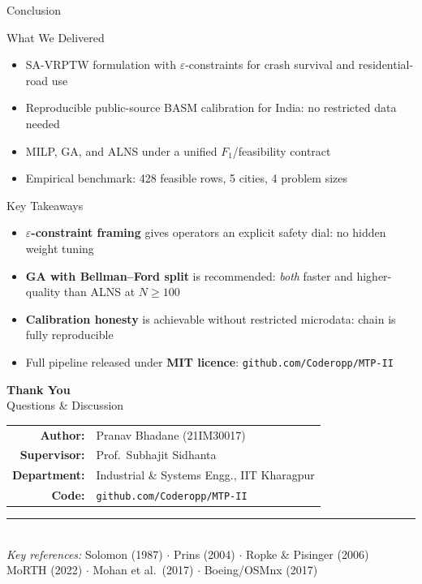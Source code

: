 \documentclass[aspectratio=169,t]{beamer}
\begin{document}
\begin{frame}{Conclusion}
\begin{block}{What We Delivered}
  \begin{itemize}
    \item SA-VRPTW formulation with $\varepsilon$-constraints for crash survival and residential-road use
    \item Reproducible public-source BASM calibration for India: no restricted data needed
    \item MILP, GA, and ALNS under a unified $F_1$/feasibility contract
    \item Empirical benchmark: 428 feasible rows, 5 cities, 4 problem sizes
  \end{itemize}
\end{block}
\vspace{5pt}
\begin{block}{Key Takeaways}
  \begin{itemize}
    \item \textbf{$\varepsilon$-constraint framing} gives operators an explicit safety dial: no hidden weight tuning
    \item \textbf{GA with Bellman--Ford split} is recommended: \textit{both} faster and higher-quality than ALNS at $N\geq100$
    \item \textbf{Calibration honesty} is achievable without restricted microdata: chain is fully reproducible
    \item Full pipeline released under \textbf{MIT licence}: \texttt{github.com/Coderopp/MTP-II}
  \end{itemize}
\end{block}
\end{frame}

\begin{frame}[plain]
\begin{center}
  \vspace{10pt}
  {\LARGE\textbf{Thank You}}\\[10pt]
  {\large Questions \& Discussion}\\[18pt]

  \begin{tabular}{rl}
    \textbf{Author:}      & Pranav Bhadane (21IM30017)\\
    \textbf{Supervisor:}  & Prof.\ Subhajit Sidhanta\\
    \textbf{Department:}  & Industrial \& Systems Engg., IIT Kharagpur\\
    \textbf{Code:}        & \texttt{github.com/Coderopp/MTP-II}\\
  \end{tabular}

  \vspace{14pt}
  \rule{0.55\textwidth}{0.4pt}\\[6pt]
  {\small
  \textit{Key references:}
  Solomon (1987) $\cdot$ Prins (2004) $\cdot$ Ropke \& Pisinger (2006)\\
  MoRTH (2022) $\cdot$ Mohan et al.\ (2017) $\cdot$ Boeing/OSMnx (2017)
  }
\end{center}
\end{frame}
\end{document}
